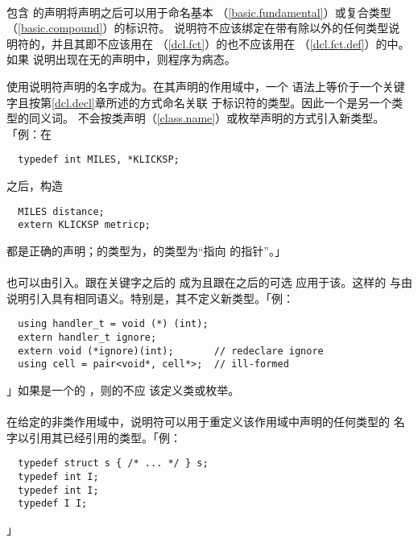 \paragraph{}
包含 的声明将声明之后可以用于命名基本
（\ref{basic.fundamental}）或复合类型（\ref{basic.compound}）的标识符。
说明符不应该绑定在带有除以外的任何类型说
明符的，并且其即不应该用在
（\ref{dcl.fct}）的也不应该用在
（\ref{dcl.fct.def}）的中。如果
说明出现在无的声明中，则程序为病态。


使用说明符声明的名字成为。在其声明的作用域中，一个
语法上等价于一个关键字且按第\ref{dcl.decl}章所述的方式命名关联
于标识符的类型。因此一个是另一个类型的同义词。
不会按类声明（\ref{class.name}）或枚举声明的方式引入新类型。「例：在
\begin{lstlisting}
  typedef int MILES, *KLICKSP;
\end{lstlisting}
之后，构造
\begin{lstlisting}
  MILES distance;
  extern KLICKSP metricp;
\end{lstlisting}
都是正确的声明；的类型为，的类型为``指向
的指针''。」

\paragraph{}
也可以由引入。跟在关键字之后的
成为且跟在之后的可选
应用于该。这样的
与由说明引入具有相同语义。特别是，其不定义新类型。「例：
\begin{lstlisting}
  using handler_t = void (*) (int);
  extern handler_t ignore;
  extern void (*ignore)(int);       // redeclare ignore
  using cell = pair<void*, cell*>;  // ill-formed
\end{lstlisting}」如果是一个的
，则的不应
该定义类或枚举。

\paragraph{}
在给定的非类作用域中，说明符可以用于重定义该作用域中声明的任何类型的
名字以引用其已经引用的类型。「例：
\begin{lstlisting}
  typedef struct s { /* ... */ } s;
  typedef int I;
  typedef int I;
  typedef I I;
\end{lstlisting}」

